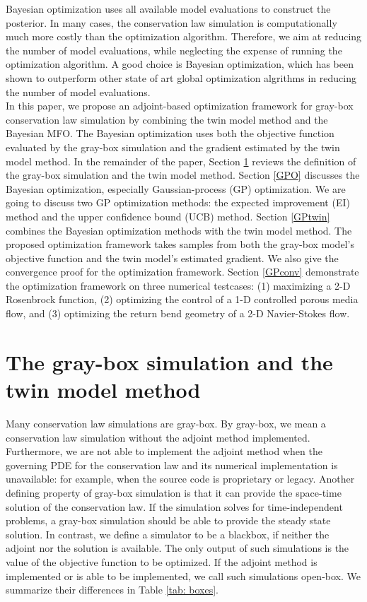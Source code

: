 \documentclass[a4paper,onecolumn]{article}
\theoremstyle{remark}
\begin{document}
\indent Bayesian optimization uses all available model evaluations
to construct the posterior. 
In many cases, the conservation law simulation is computationally much more costly than
the optimization algorithm. Therefore, we aim at reducing the number of model evaluations,
while neglecting the expense of running the optimization algorithm.
A good choice is Bayesian optimization, which has been shown to outperform other state of art
global optimization algrithms in reducing the number of model evaluations.\\

\indent In this paper, we propose an adjoint-based optimization framework for gray-box 
conservation law simulation by combining the twin model method and the Bayesian MFO.
The Bayesian optimization uses both the objective function evaluated by the gray-box simulation and 
the gradient estimated by the twin model method. In the remainder of the paper, Section 
\ref{section graybox and twin} reviews the definition of
the gray-box simulation and the twin model method.
Section \ref{GPO} discusses the Bayesian optimization, especially Gaussian-process (GP) optimization. 
We are going to discuss two GP optimization methods:
the expected improvement (EI) method and the upper confidence bound (UCB) method.
Section \ref{GPtwin} combines the Bayesian optimization methods with the twin model method.
The proposed optimization framework takes samples from both the gray-box model's objective
function and the twin model's estimated gradient.
We also give the convergence proof for the optimization framework.
Section \ref{GPconv} demonstrate the optimization framework on three numerical testcases: (1) maximizing a 2-D Rosenbrock function,
(2) optimizing the control of a 1-D controlled porous media flow, and (3) optimizing the return bend geometry
of a 2-D Navier-Stokes flow.

\section{The gray-box simulation and the twin model method}
\label{section graybox and twin}
\noindent Many conservation law simulations are gray-box. 
By gray-box, we mean a conservation law simulation
 without the adjoint method implemented. Furthermore, we are not able to implement the adjoint method
when the governing PDE for the conservation law and its numerical implementation is unavailable:
for example, when the source code is proprietary or legacy.
Another defining property of gray-box simulation is that it can provide the space-time solution of the conservation law.
If the simulation solves for time-independent problems, a gray-box simulation should be able to 
provide the steady state solution.
In contrast, we define a simulator to be a blackbox, if neither the adjoint nor the solution is available.
The only output of such simulations is the value of the objective function to be optimized.
If the adjoint method is implemented or is able to be implemented,
we call such simulations open-box.
We summarize their differences in Table \ref{tab: boxes}.\\
\end{document}
